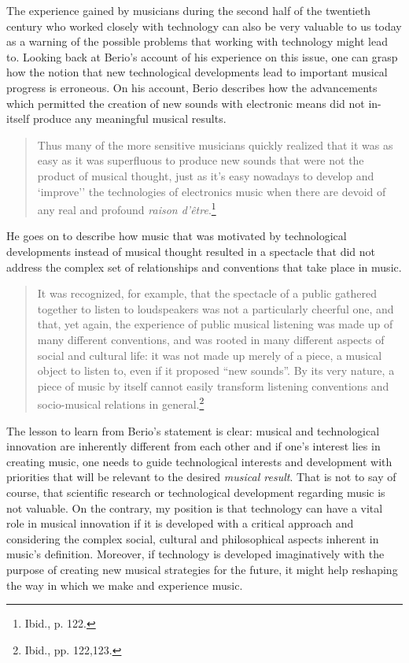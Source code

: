 The experience gained by musicians during the second half of the twentieth century who worked closely with technology can also be very valuable to us today as a warning of the possible problems that working with technology might lead to. Looking back at Berio's account of his experience on this issue, one can grasp how the notion that new technological developments lead to important musical progress is erroneous. On his account, Berio describes how the advancements which permitted the creation of new sounds with electronic means did not in-itself produce any meaningful musical results. 
\begin{quote}
Thus many of the more sensitive musicians quickly realized that it was as easy as it was superfluous to produce new sounds that were not the product of musical thought, just as it's easy nowadays to develop and `improve'' the technologies of electronics music when there are devoid of any real and profound \emph{raison d'\^{e}tre}.\footnote{Ibid., p. 122.}
\end{quote}
He goes on to describe how music that was motivated by technological developments instead of musical thought resulted in a spectacle that did not address the complex set of relationships and conventions that take place in music.
\begin{quote}
It was recognized, for example, that the spectacle of a public gathered together to listen to loudspeakers was not a particularly cheerful one, and that, yet again, the experience of public musical listening was made up of many different conventions, and was rooted in many different aspects of social and cultural life: it was not made up merely of a piece, a musical object to listen to, even if it proposed ``new sounds''. By its very nature, a piece of music by itself cannot easily transform listening conventions and socio-musical relations in general.\footnote{Ibid., pp. 122,123.}
\end{quote}
The lesson to learn from Berio's statement is clear: musical and technological innovation are inherently different from each other and if one's interest lies in creating music, one needs to guide technological interests and development with priorities that will be relevant to the desired \emph{musical result}. That is not to say of course, that scientific research or technological development regarding music is not valuable. On the contrary, my position is that technology can have a vital role in musical innovation if it is developed with a critical approach and considering the complex social, cultural and philosophical aspects inherent in music's definition. Moreover, if technology is developed imaginatively with the purpose of creating new musical strategies for the future, it might help reshaping the way in which we make and experience music.


